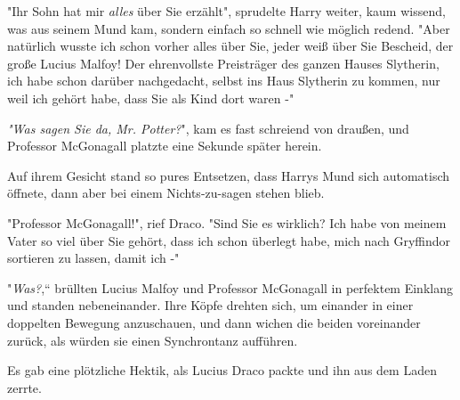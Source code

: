 "Ihr Sohn hat mir \emph{alles} über Sie erzählt", sprudelte Harry weiter, kaum wissend, was aus seinem Mund kam, sondern einfach so schnell wie möglich redend. "Aber natürlich wusste ich schon vorher alles über Sie, jeder weiß über Sie Bescheid, der große Lucius Malfoy! Der ehrenvollste Preisträger des ganzen Hauses Slytherin, ich habe schon darüber nachgedacht, selbst ins Haus Slytherin zu kommen, nur weil ich gehört habe, dass Sie als Kind dort waren -" 

\emph{"Was sagen Sie da, Mr. Potter?}", kam es fast schreiend von draußen, und Professor McGonagall platzte eine Sekunde später herein.

Auf ihrem Gesicht stand so pures Entsetzen, dass Harrys Mund sich automatisch öffnete, dann aber bei einem Nichts-zu-sagen stehen blieb. 

"Professor McGonagall!", rief Draco. "Sind Sie es wirklich? Ich habe von meinem Vater so viel über Sie gehört, dass ich schon überlegt habe, mich nach Gryffindor sortieren zu lassen, damit ich -" 


"\emph{Was?},“ brüllten Lucius Malfoy und Professor McGonagall in perfektem Einklang und standen nebeneinander. Ihre Köpfe drehten sich, um einander in einer doppelten Bewegung anzuschauen, und dann wichen die beiden voreinander zurück, als würden sie einen Synchrontanz aufführen. 

Es gab eine plötzliche Hektik, als Lucius Draco packte und ihn aus dem Laden zerrte. 

